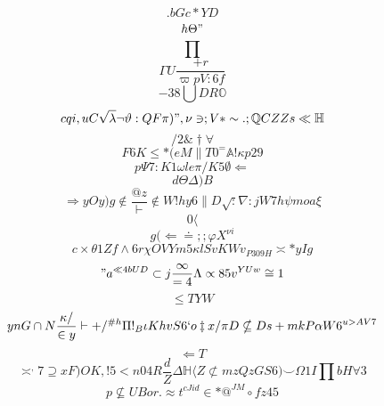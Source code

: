 \documentclass[12pt]{article}
\begin{document}
        \begin{minipage}[t][0pt]{\linewidth}

        \[.bGc*YD\]
\[h\Theta "\]
\[\prod\]
\[\Gamma U\frac{+r}{\varpi p V : 6 f}\]
\[-38\bigcup D R\mathbb{O}\]
\[cqi,uC\sqrt{\lambda}\neg\vartheta : Q F\pi ) " ,\nu\ni ; V *\sim . ;\mathbb{Q} C Z Z s\ll\mathbb{H}\]
\[/2\&\dagger\forall\]
\[F6K\leq * ( e M\parallel T 0^{=}\mathbb{A} !\kappa p 2 9\]
\[p\Psi 7 : K 1\omega l e\pi / K 5\emptyset\Leftarrow\]
\[d\Theta\Delta ) B\]
\[\Rightarrow y O y ) g\notin\frac{@z}{\vdash}\notin W ! h y 6\parallel D\sqrt{:}\nabla : j W 7 h\psi m o a\xi\]
\[0\langle\]
\[g(\Longleftarrow\doteq ; ;\varphi X^{\nu i}\]
\[c\times\theta 1 Z f\land 6 r\chi O V Y m 5\kappa l S v K W v_{P309H}\asymp * y I g\]
\["a^{\ll 4 b U D}\subset j\frac{\infty}{ = 4}\Lambda\propto 8 5 v^{YUw}\cong 1\]
\[\leq T Y W\]
\[ynG\cap N\frac{\kappa /}{\in y}\vdash + /^{\# h}\Pi !_{B}\iota K h v S 6 ` o\ddagger x /\pi D\nsubseteq D s + m k P\alpha W 6^{u>AV7}\]
\[\Longleftarrow T\]
\[\asymp^{,}7\supseteq x F ) O K , ! 5 < n 0 4 R\frac{d}{Z}\Delta\mathbb{H}\langle Z\not\subset m z Q z G S 6 )\smile\Omega 1 I\prod b H\forall 3\]
\[p\nsubseteq U B o r .\approx t^{cJid}\in * @^{JM}\circ f z 4 5
        \]
\end{minipage}
\end{document}
